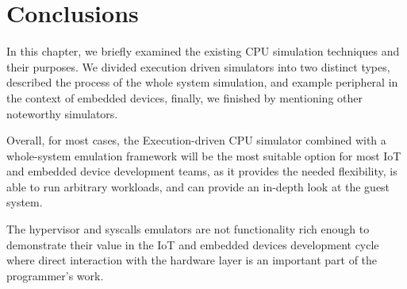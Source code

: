 \section{Conclusions}

In this chapter, we briefly examined the existing CPU simulation techniques and their purposes. We divided execution
driven simulators into two distinct types, described the process of the whole system simulation, 
and example peripheral
in the context of embedded devices, finally, we finished by mentioning other noteworthy simulators.

Overall, for most cases, the Execution-driven CPU simulator combined with a whole-system emulation framework will be the
most suitable option for most IoT and embedded device development teams, as it provides the needed flexibility, is able
to run arbitrary workloads, and can provide an in-depth look at the guest system.

The hypervisor and syscalls emulators are not functionality rich enough to demonstrate their value in the IoT and
embedded devices development cycle where direct interaction with the hardware layer is an important part of the programmer's work.